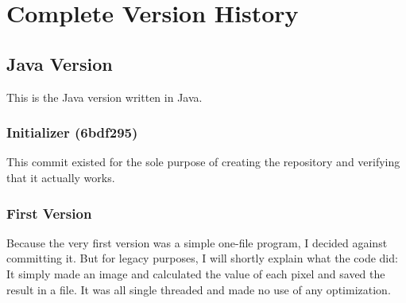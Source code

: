 \documentclass[10pt,a4paper,titlepage]{article}
\begin{document}
	\appendix
	\section{Complete Version History}\label{appendix:version_history}
	\subsection{Java Version}
	This is the Java version written in Java.
	\subsubsection{Initializer (6bdf295)}
	This commit existed for the sole purpose of creating the repository and verifying that it actually works.
	\subsubsection{First Version}
	Because the very first version was a simple one-file program, I decided against committing it. But for legacy purposes, I will shortly explain what the code did: It simply made an image and calculated the value of each pixel and saved the result in a file. It was all single threaded and made no use of any optimization.
\end{document}
